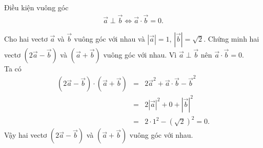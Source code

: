 \begin{dang}{Điều kiện vuông góc}
	\begin{eqnarray*}
		\overrightarrow{a}\perp\overrightarrow{b}\Leftrightarrow \overrightarrow{a}\cdot\overrightarrow{b}=0.
	\end{eqnarray*}
\end{dang}
\viduminhhoa
\begin{vd}%
	Cho hai vectơ $\overrightarrow{a}$ và $\overrightarrow{b}$ vuông góc với nhau và $\left |\overrightarrow{a} \right |=1$, $\left |\overrightarrow{b} \right |=\sqrt{2}$. Chứng minh hai vectơ $\left (2\overrightarrow{a}-\overrightarrow{b} \right )$ và $\left (\overrightarrow{a}+\overrightarrow{b} \right )$ vuông góc với nhau.
	\loigiai
	{
		Vì $\overrightarrow{a}\perp\overrightarrow{b}$ nên $\overrightarrow{a}\cdot\overrightarrow{b}=0$.\\
		Ta có
		\begin{eqnarray*}
			\left (2\overrightarrow{a}-\overrightarrow{b} \right )\cdot \left (\overrightarrow{a}+\overrightarrow{b} \right )&=&2\overrightarrow{a}^2+\overrightarrow{a}\cdot\overrightarrow{b}-\overrightarrow{b}^2\\&=&2\left |\overrightarrow{a} \right |^2+0+\left |\overrightarrow{b} \right |^2\\&=&2\cdot 1^2-\left (\sqrt{2} \right )^2=0.
		\end{eqnarray*}
		Vậy hai vectơ $\left (2\overrightarrow{a}-\overrightarrow{b} \right )$ và $\left (\overrightarrow{a}+\overrightarrow{b} \right )$ vuông góc với nhau.
	}
\end{vd}

